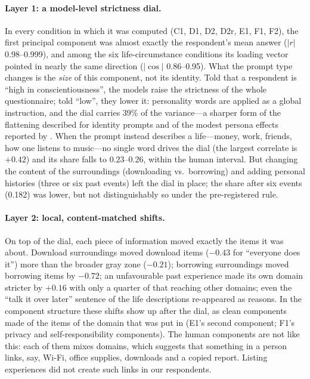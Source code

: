 \documentclass[11pt]{article}
\begin{document}
\paragraph{Layer 1: a model-level strictness dial.}
In every condition in which it was computed (C1, D1, D2, D2r, E1, F1, F2), the first principal component was almost exactly the respondent's mean answer ($|r|$ 0.98--0.999), and among the six life-circumstance conditions its loading vector pointed in nearly the same direction ($|\cos|$ 0.86--0.95). What the prompt type changes is the \emph{size} of this component, not its identity. Told that a respondent is ``high in conscientiousness'', the models raise the strictness of the whole questionnaire; told ``low'', they lower it: personality words are applied as a global instruction, and the dial carries 39\% of the variance---a sharper form of the flattening described for identity prompts \citep{wang2024flatten} and of the modest persona effects reported by \citet{hu2024persona}. When the prompt instead describes a life---money, work, friends, how one listens to music---no single word drives the dial (the largest correlate is $+0.42$) and its share falls to 0.23--0.26, within the human interval. But changing the content of the surroundings (downloading vs.\ borrowing) and adding personal histories (three or six past events) left the dial in place; the share after six events (0.182) was lower, but not distinguishably so under the pre-registered rule.

\paragraph{Layer 2: local, content-matched shifts.}
On top of the dial, each piece of information moved exactly the items it was about. Download surroundings moved download items ($-0.43$ for ``everyone does it'') more than the broader gray zone ($-0.21$); borrowing surroundings moved borrowing items by $-0.72$; an unfavourable past experience made its own domain stricter by $+0.16$ with only a quarter of that reaching other domains; even the ``talk it over later'' sentence of the life descriptions re-appeared as reasons. In the component structure these shifts show up after the dial, as clean components made of the items of the domain that was put in (E1's second component; F1's privacy and self-responsibility components). The human components are not like this: each of them mixes domains, which suggests that something in a person links, say, Wi-Fi, office supplies, downloads and a copied report. Listing experiences did not create such links in our respondents.
\end{document}
